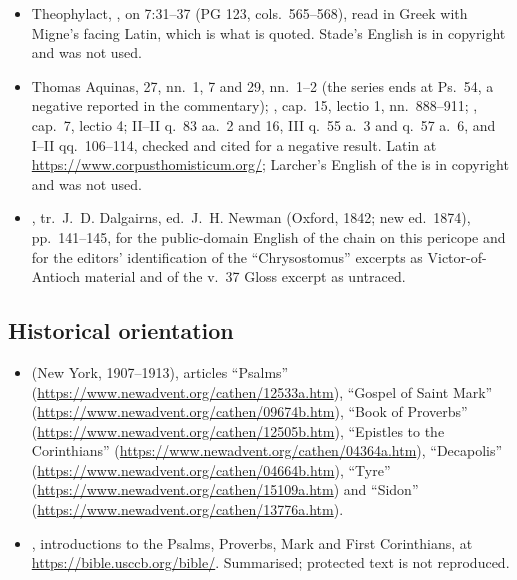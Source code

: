 \begin{itemize}[leftmargin=1.2em, itemsep=0.15em]
\item Theophylact, , on 7:31--37 (PG 123,
cols.\ 565--568), read in Greek with Migne's facing Latin, which is what is
quoted. Stade's English is in copyright and was not used.
\item Thomas Aquinas,  27, nn.~1, 7 and 
29, nn.~1--2 (the series ends at Ps.\ 54, a negative reported in the
commentary); , cap.~15, lectio 1, nn.~888--911;
, cap.~7, lectio 4;  II--II
q.~83 aa.~2 and 16, III q.~55 a.~3 and q.~57 a.~6, and I--II qq.~106--114,
checked and cited for a negative result. Latin at
\url{https://www.corpusthomisticum.org/}; Larcher's English of the
 is in copyright and was not used.
\item {},
tr.\ J.~D. Dalgairns, ed.\ J.~H. Newman (Oxford, 1842; new ed.\ 1874),
pp.\ 141--145, for the public-domain English of the chain on this pericope and
for the editors' identification of the ``Chrysostomus'' excerpts as
Victor-of-Antioch material and of the v.~37 Gloss excerpt as untraced.
\end{itemize}

\subsection*{Historical orientation}

\begin{itemize}[leftmargin=1.2em, itemsep=0.15em]
\item {} (New York, 1907--1913), articles
``Psalms'' (\url{https://www.newadvent.org/cathen/12533a.htm}), ``Gospel of
Saint Mark'' (\url{https://www.newadvent.org/cathen/09674b.htm}), ``Book of
Proverbs'' (\url{https://www.newadvent.org/cathen/12505b.htm}), ``Epistles to
the Corinthians'' (\url{https://www.newadvent.org/cathen/04364a.htm}),
``Decapolis'' (\url{https://www.newadvent.org/cathen/04664b.htm}), ``Tyre''
(\url{https://www.newadvent.org/cathen/15109a.htm}) and ``Sidon''
(\url{https://www.newadvent.org/cathen/13776a.htm}).
\item {}, introductions to the Psalms,
Proverbs, Mark and First Corinthians, at \url{https://bible.usccb.org/bible/}.
Summarised; protected text is not reproduced.
\end{itemize}

